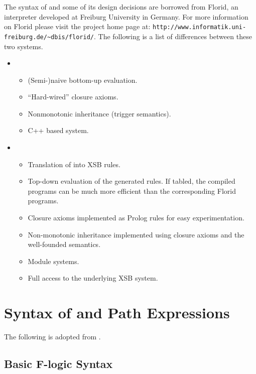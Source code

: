 \documentclass[11pt]{report}
\begin{document}
The syntax of \FLORA and some of its design decisions are borrowed from
Florid, an \fl interpreter developed at Freiburg University in Germany.
For more information on Florid please visit the project home page at:
\verb|http://www.informatik.uni-freiburg.de/~dbis/florid/|. The following
is a list of differences between these two systems.

\begin{itemize}
\item \FLORID
  \begin{itemize}
  \item (Semi-)naive bottom-up evaluation.
  \item ``Hard-wired'' closure axioms.
  \item Nonmonotonic inheritance (trigger semantics).
  \item C++ based system.
  \end{itemize}
\item \FLORA
  \begin{itemize}
  \item Translation of \fl into XSB rules.
  \item Top-down evaluation of the generated rules. If tabled, the compiled 
    programs can be much more efficient than the corresponding Florid
    programs.
  \item Closure axioms implemented as Prolog rules for easy experimentation.
  \item Non-monotonic inheritance implemented using closure axioms and the
    well-founded semantics.
  \item Module systems.
  \item Full access to the underlying XSB system.
  \end{itemize}
\end{itemize}



\section{Syntax of \FLORA and Path Expressions }

The following is adopted from \cite{ludaescher-himmeroeder-IS-98}.


\subsection{Basic F-logic Syntax}\label{sec-basic-flogic}
\end{document}
